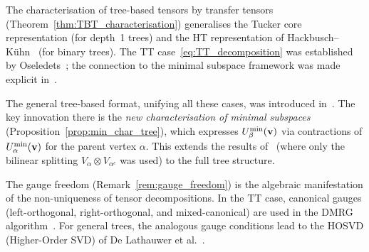 The characterisation of tree-based tensors by transfer tensors
(Theorem~\ref{thm:TBT_characterisation}) generalises the Tucker core
representation (for depth~1 trees) and the HT representation of
Hackbusch--Kühn~\cite{HaKuehn2009} (for binary trees). The TT
case~\eqref{eq:TT_decomposition} was established by Oseledets~\cite{Oseledets2011};
the connection to the minimal subspace framework was made explicit
in~\cite{FH2012}.

The general tree-based format, unifying all these cases, was introduced
in~\cite{FHN2021}. The key innovation there is the \emph{new
characterisation of minimal subspaces} (Proposition~\ref{prop:min_char_tree}),
which expresses $U^{\min}_{\beta}(\mathbf{v})$ via contractions of
$U^{\min}_{\alpha}(\mathbf{v})$ for the parent vertex $\alpha$. This extends
the results of~\cite{FH2012} (where only the bilinear splitting
$V_\alpha \otimes V_{\alpha^c}$ was used) to the full tree structure.

The gauge freedom (Remark~\ref{rem:gauge_freedom}) is the algebraic
manifestation of the non-uniqueness of tensor decompositions. In the
TT case, canonical gauges (left-orthogonal, right-orthogonal, and
mixed-canonical) are used in the DMRG algorithm~\cite{HoltzRohwedderSchneider2012}.
For general trees, the analogous gauge conditions lead to the HOSVD
(Higher-Order SVD) of De Lathauwer et al.~\cite{DeLathauwer2000}.

